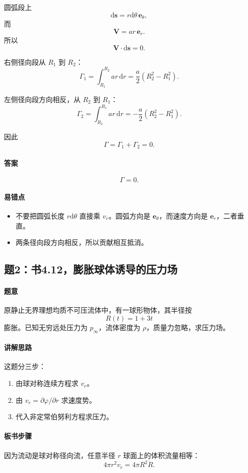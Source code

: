 \documentclass[12pt,a4paper]{ctexart}
\newcommand{\dd}{\mathrm d}
\newcommand{\pinf}{p_\infty}
\begin{document}
圆弧段上
\[
\dd \bm s=r\dd\theta\,\bm e_\theta ,
\]
而
\[
\bm V=ar\,\bm e_r.
\]
所以
\[
\bm V\cdot \dd \bm s=0.
\]

右侧径向段从 $R_1$ 到 $R_2$：
\[
\Gamma_1=\int_{R_1}^{R_2} ar\,\dd r
=\frac a2(R_2^2-R_1^2).
\]

左侧径向段方向相反，从 $R_2$ 到 $R_1$：
\[
\Gamma_2=\int_{R_2}^{R_1} ar\,\dd r
=-\frac a2(R_2^2-R_1^2).
\]

因此
\[
\Gamma=\Gamma_1+\Gamma_2=0.
\]

\paragraph{答案}
\[
\boxed{\Gamma=0.}
\]

\paragraph{易错点}
\begin{itemize}
  \item 不要把圆弧长度 $r\dd\theta$ 直接乘 $v_r$。圆弧方向是 $\bm e_\theta$，而速度方向是 $\bm e_r$，二者垂直。
  \item 两条径向段方向相反，所以贡献相互抵消。
\end{itemize}

\subsection*{题2：书4.12，膨胀球体诱导的压力场}

\paragraph{题意}
原静止无界理想均质不可压流体中，有一球形物体，其半径按
\[
R(t)=1+3t
\]
膨胀。已知无穷远处压力为 $\pinf$，流体密度为 $\rho$，质量力忽略，求压力场。

\paragraph{讲解思路}
这题分三步：
\begin{enumerate}
  \item 由球对称连续方程求 $v_r$。
  \item 由 $v_r=\partial\varphi/\partial r$ 求速度势。
  \item 代入非定常伯努利方程求压力。
\end{enumerate}

\paragraph{板书步骤}
因为流动是球对称径向流，任意半径 $r$ 球面上的体积流量相等：
\[
4\pi r^2 v_r=4\pi R^2\dot R.
\]
\end{document}
